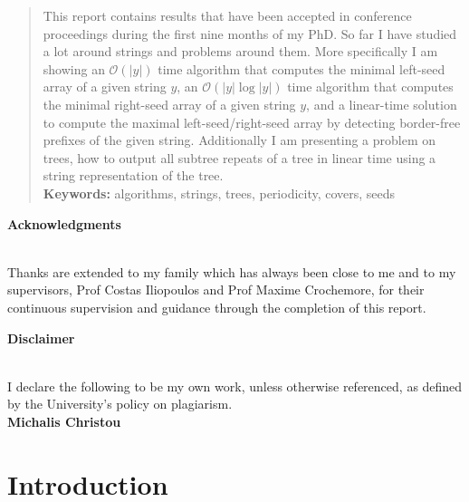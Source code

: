 \documentclass[preprint,12pt]{elsarticle}
\newcommand{\cO}{\ensuremath{\mathcal{O}}}
\begin{document}
\begin{frontmatter}

\begin{center}
\begin{abstract}

This report contains results that have been accepted in conference proceedings during the first nine months of my PhD. 
So far I have studied a lot around strings and problems around them. More specifically I am showing an $\cO(|y|)$ time algorithm that computes the minimal left-seed array of a given string $y$, an $\cO(|y|\log |y|)$ time algorithm that computes the minimal right-seed array of a given string $y$, and a linear-time solution to compute the maximal left-seed/right-seed array by detecting border-free prefixes of the given string. Additionally I am presenting a problem on trees, how to output all subtree repeats of a tree in linear time using a string representation of the tree. \\
\noindent\textbf{Keywords:} algorithms, strings, trees, periodicity, covers, seeds

\end{abstract}
\end{center}

\end{frontmatter}

\newpage
\noindent\begin{large}\textbf{Acknowledgments}\end{large}\\
Thanks are extended to my family which has always been close to me and to my supervisors, Prof Costas Iliopoulos and Prof Maxime Crochemore, for their continuous supervision and guidance through the completion of this report.
\newpage
\noindent\begin{large}\textbf{Disclaimer}\end{large}\\
I declare the following to be my own work, unless otherwise referenced, as defined by the University’s policy on plagiarism.\\
\textbf{Michalis Christou}

\newpage
\tableofcontents
\newpage

\section{Introduction}
\end{document}
